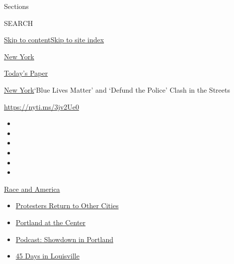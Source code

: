 Sections

SEARCH

\protect\hyperlink{site-content}{Skip to
content}\protect\hyperlink{site-index}{Skip to site index}

\href{https://www.nytimes3xbfgragh.onion/section/nyregion}{New York}

\href{https://myaccount.nytimes3xbfgragh.onion/auth/login?response_type=cookie\&client_id=vi}{}

\href{https://www.nytimes3xbfgragh.onion/section/todayspaper}{Today's
Paper}

\href{/section/nyregion}{New York}\textbar{}`Blue Lives Matter' and
`Defund the Police' Clash in the Streets

\url{https://nyti.ms/3jv2Ue0}

\begin{itemize}
\item
\item
\item
\item
\item
\item
\end{itemize}

\href{https://www.nytimes3xbfgragh.onion/news-event/george-floyd-protests-minneapolis-new-york-los-angeles?action=click\&pgtype=Article\&state=default\&region=TOP_BANNER\&context=storylines_menu}{Race
and America}

\begin{itemize}
\tightlist
\item
  \href{https://www.nytimes3xbfgragh.onion/2020/07/26/us/protests-portland-seattle-trump.html?action=click\&pgtype=Article\&state=default\&region=TOP_BANNER\&context=storylines_menu}{Protesters
  Return to Other Cities}
\item
  \href{https://www.nytimes3xbfgragh.onion/2020/07/24/us/portland-oregon-protests-white-race.html?action=click\&pgtype=Article\&state=default\&region=TOP_BANNER\&context=storylines_menu}{Portland
  at the Center}
\item
  \href{https://www.nytimes3xbfgragh.onion/2020/07/23/podcasts/the-daily/portland-protests.html?action=click\&pgtype=Article\&state=default\&region=TOP_BANNER\&context=storylines_menu}{Podcast:
  Showdown in Portland}
\item
  \href{https://www.nytimes3xbfgragh.onion/interactive/2020/07/16/us/black-lives-matter-protests-louisville-breonna-taylor.html?action=click\&pgtype=Article\&state=default\&region=TOP_BANNER\&context=storylines_menu}{45
  Days in Louisville}
\end{itemize}

